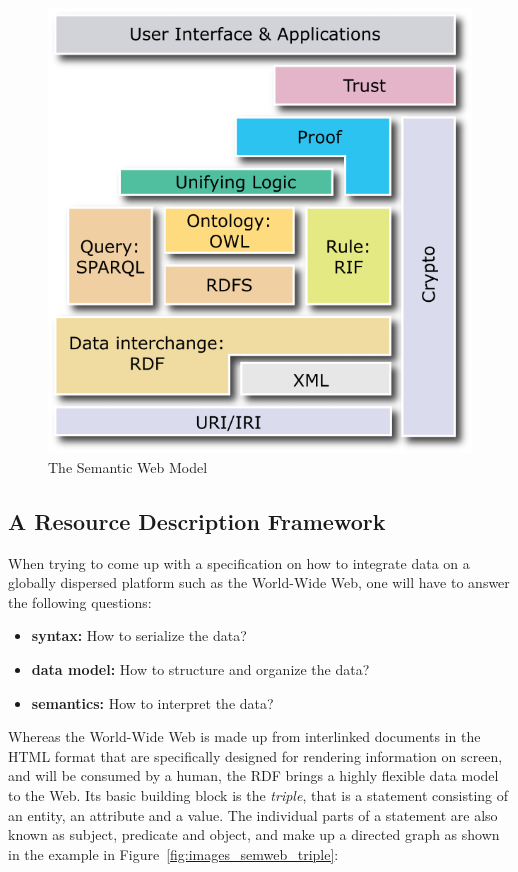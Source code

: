 \begin{figure}[H]
	\centering
		\includegraphics[width=0.8\columnwidth]{images/semantic_web_layers.png}
	\caption[The Semantic Web Model]{The Semantic Web Model \citep{W3C2013}}
\label{fig:images_semweb_model}
\end{figure}


\subsection{A Resource Description Framework}
\label{sec:semantic_rdf}

When trying to come up with a specification on how to integrate data on a globally dispersed platform such as the World-Wide Web, one will have to answer the following questions: \@

\begin{itemize}
	\item \textbf{syntax:} How to serialize the data?
	\item \textbf{data model:} How to structure and organize the data?
	\item \textbf{semantics:} How to interpret the data?
\end{itemize}

Whereas the World-Wide Web is made up from interlinked documents in the \gls{HTML} format that are specifically designed for rendering information on screen, and will be consumed by a human, the \gls{RDF} brings a highly flexible data model to the Web. Its basic building block is the \emph{triple}, that is a statement consisting of an entity, an attribute and a value. The individual parts of a statement are also known as subject, predicate and object, and make up a directed graph as shown in the example in Figure~\ref{fig:images_semweb_triple}: \@

